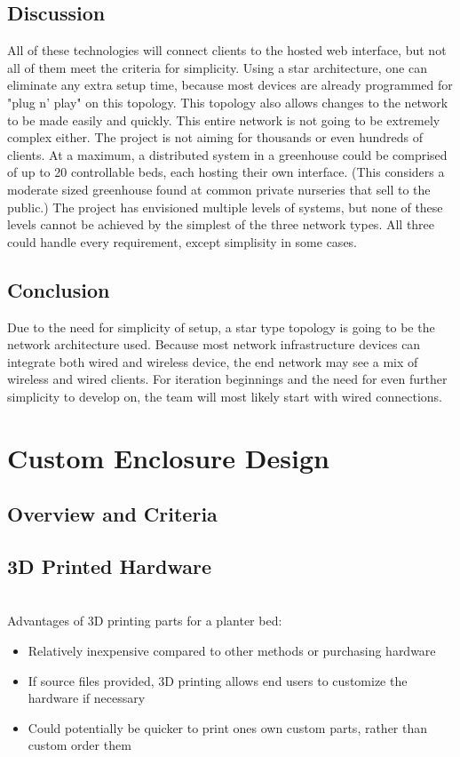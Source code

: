 \documentclass[onecolumn, draftclsnofoot,10pt, compsoc]{IEEEtran}
\begin{document}
		\subsection{Discussion}
		All of these technologies will connect clients to the hosted web interface, but not all of them meet the criteria for simplicity.
		Using a star architecture, one can eliminate any extra setup time, because most devices are already programmed for "plug n' play" on this topology.
		This topology also allows changes to the network to be made easily and quickly.
		This entire network is not going to be extremely complex either.  The project is not aiming for thousands or even hundreds of clients.
		At a maximum, a distributed system in a greenhouse could be comprised of up to 20 controllable beds, each hosting their own interface.
		(This considers a moderate sized greenhouse found at common private nurseries that sell to the public.) 	The project has envisioned multiple levels of systems,
		but none of these levels cannot be achieved by the simplest of the three network types.  All three could handle every requirement, except simplisity in some cases.

		\subsection{Conclusion}
		Due to the need for simplicity of setup, a star type topology is going to be the network architecture used.
		Because most network infrastructure devices can integrate both wired and wireless device, the end network may see a mix of wireless and wired clients.
		For iteration beginnings and the need for even further simplicity to develop on, the team will most likely start with wired connections.



	\section{Custom Enclosure Design}

		\subsection{Overview and Criteria}

		\subsection{3D Printed Hardware}
		\noindent \\Advantages of 3D printing parts for a planter bed:
		\begin{itemize}
			\item Relatively inexpensive compared to other methods or purchasing hardware
			\item If source files provided, 3D printing allows end users to customize the hardware if necessary
			\item Could potentially be quicker to print ones own custom parts, rather than custom order them
		\end{itemize}
\end{document}
